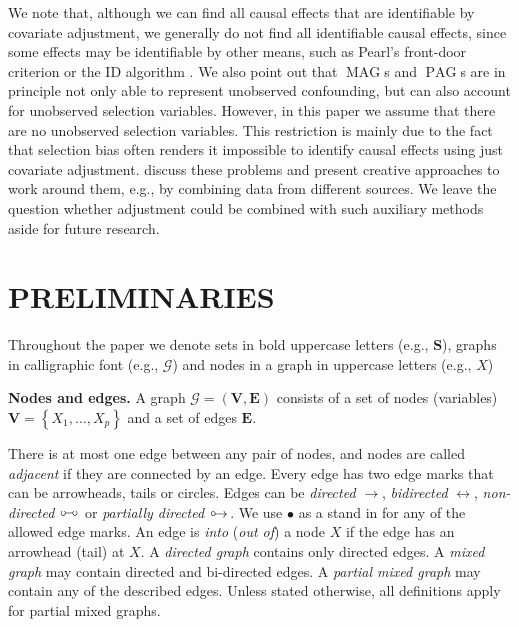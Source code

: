 \documentclass[]{article}
\DeclareMathOperator{\MAG}{MAG}
\DeclareMathOperator{\PAG}{PAG}
\theoremstyle{definition}
\theoremstyle{remark}
\newcommand{\vars}[1][V]{\mathbf{#1}}
\newcommand{\e}[1][E]{\mathbf{#1}}
\newcommand{\g}[1][G]{\mathcal{#1}}
\newcommand{\circarrow}{
  \setlength{\unitlength}{1mm}
  \begin{picture}(5,1)(0,0)
    \put(1,1){\circle{1}}
    \put(1.2,0){$\rightarrow$}
  \end{picture}
}
\newcommand{\circcirc}{
  \setlength{\unitlength}{1mm}
  \begin{picture}(5,1)(0,0)
    \put(1,1){\circle{1}}
    \put(1.5,1){\line(1,0){2}}
    \put(4,1){\circle{1}}
  \end{picture}
}
\begin{document}
We note that, although we can find all causal effects that are identifiable by covariate adjustment, we generally do not find
all identifiable causal effects, since some effects may be identifiable by other means, such as
Pearl's front-door criterion \citep[Section 3.3.2]{Pearl2009} or the ID algorithm \citep{tian2002general,shpitser2006identification}.
We also point out that $\MAG$s and $\PAG$s are in principle
not only able to represent unobserved confounding, but
can also account for unobserved selection variables.
However, in this paper we assume that there are no
unobserved selection variables. This restriction is mainly due to the fact that
selection bias often renders it impossible to
identify causal effects using
just covariate adjustment. \citet{Bareinboim2014} discuss
these problems and present creative approaches to work
around them, e.g., by combining data from different sources.
We leave the question whether adjustment
could be combined with such auxiliary methods
aside for future research.



\section{PRELIMINARIES}\label{sec: prelim}


Throughout the paper we denote sets in bold uppercase letters (e.g., $\mathbf{S}$), graphs in calligraphic font (e.g., $\g$) and nodes in a graph in uppercase letters (e.g., $X$)

\textbf{Nodes and edges.} A graph $\g= (\vars,\e) $ consists of a set of nodes (variables) $ \vars=\left\lbrace X_{1},\dots,X_{p}\right\rbrace$ and a set of edges $ \e $.

There is at most one edge between any pair of nodes, and nodes are called \textit{adjacent} if they are connected by an edge. Every edge has two edge marks that can be arrowheads, tails or circles. Edges can be \emph{directed} $\rightarrow$,  \emph{bidirected}  $\leftrightarrow$, \emph{non-directed} $\circcirc$ or \emph{partially directed} $\circarrow$. We use $\bullet$ as a stand in for any of the allowed edge marks. An edge is \textit{into} (\textit{out of}) a node $X$ if the edge has an arrowhead (tail) at $X$. A \emph{directed graph} contains only directed edges. A \emph{mixed graph} may contain directed and bi-directed edges. A \emph{partial mixed graph} may contain any of the described edges. Unless stated otherwise, all definitions apply for partial mixed graphs.
\end{document}
